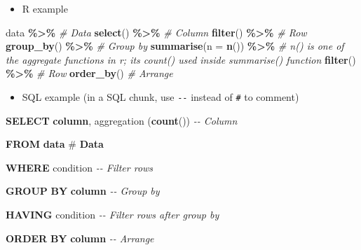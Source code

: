 \documentclass[
]{book}
\newenvironment{Shaded}{\begin{snugshade}}{\end{snugshade}}
\newcommand{\AttributeTok}[1]{\textcolor[rgb]{0.13,0.29,0.53}{#1}}
\newcommand{\CommentTok}[1]{\textcolor[rgb]{0.56,0.35,0.01}{\textit{#1}}}
\newcommand{\FunctionTok}[1]{\textcolor[rgb]{0.13,0.29,0.53}{\textbf{#1}}}
\newcommand{\KeywordTok}[1]{\textcolor[rgb]{0.13,0.29,0.53}{\textbf{#1}}}
\newcommand{\NormalTok}[1]{#1}
\newcommand{\SpecialCharTok}[1]{\textcolor[rgb]{0.81,0.36,0.00}{\textbf{#1}}}
\providecommand{\tightlist}{%
  \setlength{\itemsep}{0pt}\setlength{\parskip}{0pt}}
\begin{document}
\begin{itemize}
\tightlist
\item
  R example
\end{itemize}

\begin{Shaded}
\begin{Highlighting}[]

\NormalTok{data }\SpecialCharTok{\%\textgreater{}\%} \CommentTok{\# Data }
  \FunctionTok{select}\NormalTok{() }\SpecialCharTok{\%\textgreater{}\%} \CommentTok{\# Column}
  \FunctionTok{filter}\NormalTok{() }\SpecialCharTok{\%\textgreater{}\%} \CommentTok{\# Row }
  \FunctionTok{group\_by}\NormalTok{() }\SpecialCharTok{\%\textgreater{}\%} \CommentTok{\# Group by }
  \FunctionTok{summarise}\NormalTok{(}\AttributeTok{n =} \FunctionTok{n}\NormalTok{()) }\SpecialCharTok{\%\textgreater{}\%} \CommentTok{\# n() is one of the aggregate functions in r; it\textquotesingle{}s count() used inside summarise() function }
  \FunctionTok{filter}\NormalTok{() }\SpecialCharTok{\%\textgreater{}\%} \CommentTok{\# Row }
  \FunctionTok{order\_by}\NormalTok{() }\CommentTok{\# Arrange }
\end{Highlighting}
\end{Shaded}

\begin{itemize}
\tightlist
\item
  SQL example (in a SQL chunk, use \texttt{-\/-} instead of \texttt{\#} to comment)
\end{itemize}

\begin{Shaded}
\begin{Highlighting}[]

\KeywordTok{SELECT} \KeywordTok{column}\NormalTok{, aggregation (}\FunctionTok{count}\NormalTok{())\textasciigrave{} }\CommentTok{{-}{-} Column}

\KeywordTok{FROM} \KeywordTok{data}\NormalTok{ \# }\KeywordTok{Data} 

\KeywordTok{WHERE}\NormalTok{ condition }\CommentTok{{-}{-} Filter rows }

\KeywordTok{GROUP} \KeywordTok{BY} \KeywordTok{column} \CommentTok{{-}{-} Group by}

\KeywordTok{HAVING}\NormalTok{ condition }\CommentTok{{-}{-} Filter rows after group by  }

\KeywordTok{ORDER} \KeywordTok{BY} \KeywordTok{column} \CommentTok{{-}{-} Arrange }
\end{Highlighting}
\end{Shaded}
\end{document}
